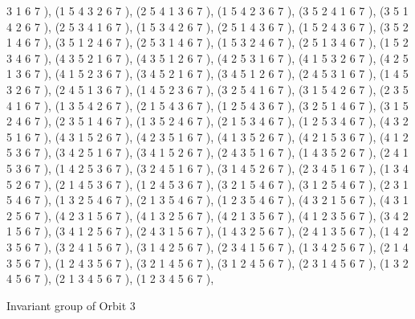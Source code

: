 \documentclass[12pt]{article}
\begin{document}
\begin{enumerate}
3 1 6 7  ), (1 5 4 3 2 6 7  ), (2 5 4 1 3 6 7  ), (1 5 4 2 3 6 7  ), (3 5 2 4 1 6 7  ), (3 5 1 4 2 6 7  ), (2 5 3 4 1 6 7  ), (1 5 3 4 2 6 7  ), (2 5 1 4 3 6 7  ), (1 5 2 4 3 6 7  ), (3 5 2 1 4 6 7  ), (3 5 1 2 4 6 7  ), (2 5 3 1 4 6 7  ), (1 5 3 2 4 6 7  ), (2 5 1 3 4 6 7  ), (1 5 2 3 4 6 7  ), (4 3 5 2 1 6 7  ), (4 3 5 1 2 6 7  ), (4 2 5 3 1 6 7  ), (4 1 5 3 2 6 7  ), (4 2 5 1 3 6 7  ), (4 1 5 2 3 6 7  ), (3 4 5 2 1 6 7  ), (3 4 5 1 2 6 7  ), (2 4 5 3 1 6 7  ), (1 4 5 3 2 6 7  ), (2 4 5 1 3 6 7  ), (1 4 5 2 3 6 7  ), (3 2 5 4 1 6 7  ), (3 1 5 4 2 6 7  ), (2 3 5 4 1 6 7  ), (1 3 5 4 2 6 7  ), (2 1 5 4 3 6 7  ), (1 2 5 4 3 6 7  ), (3 2 5 1 4 6 7  ), (3 1 5 2 4 6 7  ), (2 3 5 1 4 6 7  ), (1 3 5 2 4 6 7  ), (2 1 5 3 4 6 7  ), (1 2 5 3 4 6 7  ), (4 3 2 5 1 6 7  ), (4 3 1 5 2 6 7  ), (4 2 3 5 1 6 7  ), (4 1 3 5 2 6 7  ), (4 2 1 5 3 6 7  ), (4 1 2 5 3 6 7  ), (3 4 2 5 1 6 7  ), (3 4 1 5 2 6 7  ), (2 4 3 5 1 6 7  ), (1 4 3 5 2 6 7  ), (2 4 1 5 3 6 7  ), (1 4 2 5 3 6 7  ), (3 2 4 5 1 6 7  ), (3 1 4 5 2 6 7  ), (2 3 4 5 1 6 7  ), (1 3 4 5 2 6 7  ), (2 1 4 5 3 6 7  ), (1 2 4 5 3 6 7  ), (3 2 1 5 4 6 7  ), (3 1 2 5 4 6 7  ), (2 3 1 5 4 6 7  ), (1 3 2 5 4 6 7  ), (2 1 3 5 4 6 7  ), (1 2 3 5 4 6 7  ), (4 3 2 1 5 6 7  ), (4 3 1 2 5 6 7  ), (4 2 3 1 5 6 7  ), (4 1 3 2 5 6 7  ), (4 2 1 3 5 6 7  ), (4 1 2 3 5 6 7  ), (3 4 2 1 5 6 7  ), (3 4 1 2 5 6 7  ), (2 4 3 1 5 6 7  ), (1 4 3 2 5 6 7  ), (2 4 1 3 5 6 7  ), (1 4 2 3 5 6 7  ), (3 2 4 1 5 6 7  ), (3 1 4 2 5 6 7  ), (2 3 4 1 5 6 7  ), (1 3 4 2 5 6 7  ), (2 1 4 3 5 6 7  ), (1 2 4 3 5 6 7  ), (3 2 1 4 5 6 7  ), (3 1 2 4 5 6 7  ), (2 3 1 4 5 6 7  ), (1 3 2 4 5 6 7  ), (2 1 3 4 5 6 7  ), (1 2 3 4 5 6 7  ), 
\end{enumerate}
Invariant group of Orbit 3
\end{document}
